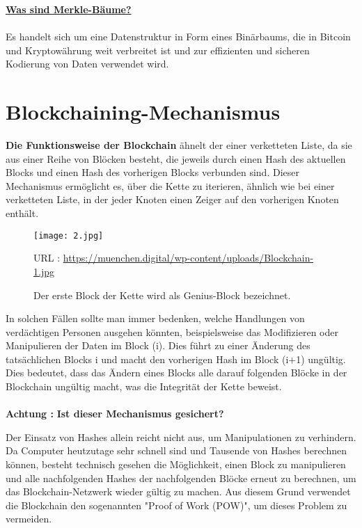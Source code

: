 \documentclass[ngerman]{scrreprt}
\begin{document}
\large
\newpage
\underline{\textbf{Was sind Merkle-Bäume?}} \\ \\
\normalsize
Es handelt sich um eine Datenstruktur in Form eines Binärbaums, die in Bitcoin und Kryptowährung weit verbreitet ist und zur effizienten und sicheren Kodierung von Daten verwendet wird.




\section{Blockchaining-Mechanismus}
\textbf{Die Funktionsweise der Blockchain} ähnelt der einer verketteten Liste, da sie aus einer Reihe von Blöcken besteht, die jeweils durch einen Hash des aktuellen Blocks und einen Hash des vorherigen Blocks verbunden sind. Dieser Mechanismus ermöglicht es, über die Kette zu iterieren, ähnlich wie bei einer verketteten Liste, in der jeder Knoten einen Zeiger auf den vorherigen Knoten enthält. \cite{fool}

\begin{figure}[h!]
	\centering
	\texttt{[image: 2.jpg]}
	\caption{Der erste Block der Kette wird als Genius-Block bezeichnet.}
	\small URL : \url{https://muenchen.digital/wp-content/uploads/Blockchain-1.jpg}
\end{figure} 
In solchen Fällen sollte man immer bedenken, welche Handlungen von verdächtigen Personen ausgehen könnten, beispielsweise das Modifizieren oder Manipulieren der Daten im Block (i). Dies führt zu einer Änderung des tatsächlichen Blocks i und macht den vorherigen Hash im Block (i+1) ungültig. Dies bedeutet, dass das Ändern eines Blocks alle darauf folgenden Blöcke in der Blockchain ungültig macht, was die Integrität der Kette beweist.\\ \\
\color{red}
\Large{\textbf{Achtung :}}
\color{black}
\textbf{Ist dieser Mechanismus gesichert?}\\
\normalsize
 	
Der Einsatz von Hashes allein reicht nicht aus, um Manipulationen zu verhindern. Da Computer heutzutage sehr schnell sind und Tausende von Hashes berechnen können, besteht technisch gesehen die Möglichkeit, einen Block zu manipulieren und alle nachfolgenden Hashes der nachfolgenden Blöcke erneut zu berechnen, um das Blockchain-Netzwerk wieder gültig zu machen. Aus diesem Grund verwendet die Blockchain den sogenannten "Proof of Work (POW)", um dieses Problem zu vermeiden.	
\end{document}
